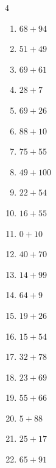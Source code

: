 \begin{multicols}{4}
\begin{enumerate}
  \item $68+94$
        \phantom{$=162$}

  \item $51+49$
        \phantom{$=100$}

  \item $69+61$
        \phantom{$=130$}

  \item $28+7$
        \phantom{$=35$}

  \item $69+26$
        \phantom{$=95$}

  \item $88+10$
        \phantom{$=98$}

  \item $75+55$
        \phantom{$=130$}

  \item $49+100$
        \phantom{$=149$}

  \item $22+54$
        \phantom{$=76$}

  \item $16+55$
        \phantom{$=71$}

  \item $0+10$
        \phantom{$=10$}

  \item $40+70$
        \phantom{$=110$}

  \item $14+99$
        \phantom{$=113$}

  \item $64+9$
        \phantom{$=73$}

  \item $19+26$
        \phantom{$=45$}

  \item $15+54$
        \phantom{$=69$}

  \item $32+78$
        \phantom{$=110$}

  \item $23+69$
        \phantom{$=92$}

  \item $55+66$
        \phantom{$=121$}

  \item $5+88$
        \phantom{$=93$}

  \item $25+17$
        \phantom{$=42$}

  \item $65+91$
        \phantom{$=156$}


\end{enumerate}
\end{multicols}
